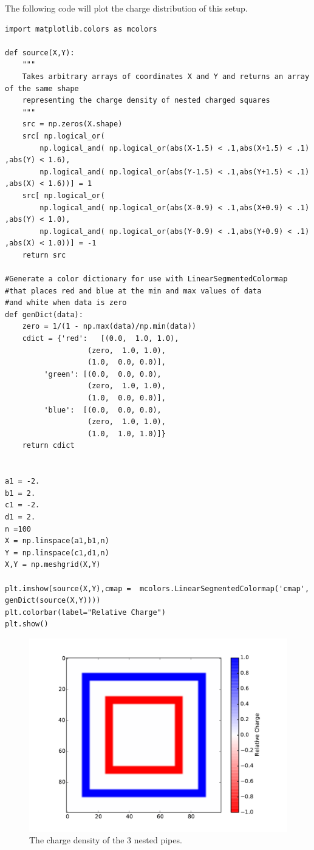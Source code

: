 The following code will plot the charge distribution of this setup.
\begin{lstlisting}
import matplotlib.colors as mcolors

def source(X,Y):
    """
    Takes arbitrary arrays of coordinates X and Y and returns an array of the same shape
    representing the charge density of nested charged squares
    """
    src = np.zeros(X.shape)
    src[ np.logical_or(
        np.logical_and( np.logical_or(abs(X-1.5) < .1,abs(X+1.5) < .1) ,abs(Y) < 1.6),
        np.logical_and( np.logical_or(abs(Y-1.5) < .1,abs(Y+1.5) < .1) ,abs(X) < 1.6))] = 1
    src[ np.logical_or(
        np.logical_and( np.logical_or(abs(X-0.9) < .1,abs(X+0.9) < .1) ,abs(Y) < 1.0),
        np.logical_and( np.logical_or(abs(Y-0.9) < .1,abs(Y+0.9) < .1) ,abs(X) < 1.0))] = -1
    return src

#Generate a color dictionary for use with LinearSegmentedColormap
#that places red and blue at the min and max values of data
#and white when data is zero
def genDict(data):
    zero = 1/(1 - np.max(data)/np.min(data))
    cdict = {'red':   [(0.0,  1.0, 1.0),
                   (zero,  1.0, 1.0),
                   (1.0,  0.0, 0.0)],
         'green': [(0.0,  0.0, 0.0),
                   (zero,  1.0, 1.0),
                   (1.0,  0.0, 0.0)],
         'blue':  [(0.0,  0.0, 0.0),
                   (zero,  1.0, 1.0),
                   (1.0,  1.0, 1.0)]}
    return cdict


a1 = -2.
b1 = 2.
c1 = -2.
d1 = 2.
n =100
X = np.linspace(a1,b1,n)
Y = np.linspace(c1,d1,n)
X,Y = np.meshgrid(X,Y)

plt.imshow(source(X,Y),cmap =  mcolors.LinearSegmentedColormap('cmap', genDict(source(X,Y))))
plt.colorbar(label="Relative Charge")
plt.show()
\end{lstlisting}

\begin{figure}
\includegraphics[width=\textwidth]{pipesRho.pdf}
\caption{The charge density of the 3 nested pipes.}
\end{figure}

